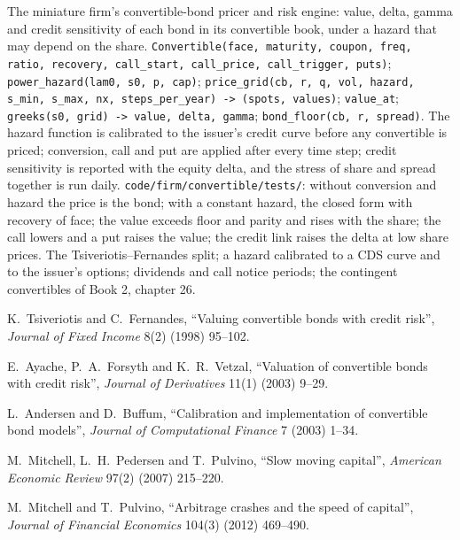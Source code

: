 \begin{build}
 The miniature firm's convertible-bond pricer and risk engine: value, delta, gamma and credit sensitivity of each bond in its
convertible book, under a hazard that may depend on the share.
 \texttt{Convertible(face, maturity, coupon, freq, ratio, recovery, call\_start, call\_price, call\_trigger, puts)};
\texttt{power\_hazard(lam0, s0, p, cap)}; \texttt{price\_grid(cb, r, q, vol, hazard, s\_min, s\_max, nx, steps\_per\_year) -> (spots, values)};
\texttt{value\_at}; \texttt{greeks(s0, grid) -> value, delta, gamma}; \texttt{bond\_floor(cb, r, spread)}.
 The hazard function is calibrated to the issuer's credit curve before any convertible is priced; conversion, call and put are applied
after every time step; credit sensitivity is reported with the equity delta, and the stress of share and spread together is run daily.
 \texttt{code/firm/convertible/tests/}: without conversion and hazard the price is the bond; with a constant hazard, the
closed form with recovery of face; the value exceeds floor and parity and rises with the share; the call lowers and a put raises the value; the
credit link raises the delta at low share prices.
 The Tsiveriotis--Fernandes split; a hazard calibrated to a CDS curve and to the issuer's options; dividends and call notice
periods; the contingent convertibles of Book 2, chapter 26.
\end{build}

\begin{omsources}
\item K.~Tsiveriotis and C.~Fernandes, ``Valuing convertible bonds with credit risk'', \emph{Journal of Fixed Income} 8(2) (1998) 95--102.
\item E.~Ayache, P.~A.~Forsyth and K.~R.~Vetzal, ``Valuation of convertible bonds with credit risk'', \emph{Journal of Derivatives} 11(1) (2003)
9--29.
\item L.~Andersen and D.~Buffum, ``Calibration and implementation of convertible bond models'', \emph{Journal of Computational Finance} 7 (2003)
1--34.
\item M.~Mitchell, L.~H.~Pedersen and T.~Pulvino, ``Slow moving capital'', \emph{American Economic Review} 97(2) (2007) 215--220.
\item M.~Mitchell and T.~Pulvino, ``Arbitrage crashes and the speed of capital'', \emph{Journal of Financial Economics} 104(3) (2012) 469--490.
\end{omsources}

